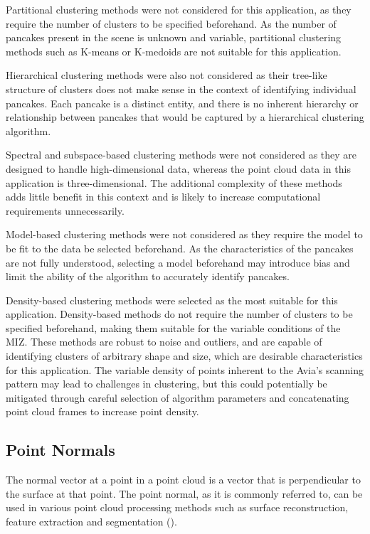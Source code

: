 Partitional clustering methods were not considered for this application, as they require the number of clusters to be specified beforehand. As the number of pancakes present in the scene is unknown and variable, partitional clustering methods such as K-means or K-medoids are not suitable for this application.

Hierarchical clustering methods were also not considered as their tree-like structure of clusters does not make sense in the context of identifying individual pancakes. Each pancake is a distinct entity, and there is no inherent hierarchy or relationship between pancakes that would be captured by a hierarchical clustering algorithm.

Spectral and subspace-based clustering methods were not considered as they are designed to handle high-dimensional data, whereas the point cloud data in this application is three-dimensional. The additional complexity of these methods adds little benefit in this context and is likely to increase computational requirements unnecessarily.

Model-based clustering methods were not considered as they require the model to be fit to the data be selected beforehand. As the characteristics of the pancakes are not fully understood, selecting a model beforehand may introduce bias and limit the ability of the algorithm to accurately identify pancakes.

Density-based clustering methods were selected as the most suitable for this application. Density-based methods do not require the number of clusters to be specified beforehand, making them suitable for the variable conditions of the \ac{MIZ}. These methods are robust to noise and outliers, and are capable of identifying clusters of arbitrary shape and size, which are desirable characteristics for this application. The variable density of points inherent to the Avia's scanning pattern may lead to challenges in clustering, but this could potentially be mitigated through careful selection of algorithm parameters and concatenating point cloud frames to increase point density.

\subsection{Point Normals}
\label{subsec:ch3.section3.subsec3}

The normal vector at a point in a point cloud is a vector that is perpendicular to the surface at that point. The point normal, as it is commonly referred to, can be used in various point cloud processing methods such as surface reconstruction, feature extraction and segmentation (\cite{harrapOverviewLIDARCollection2010}).

